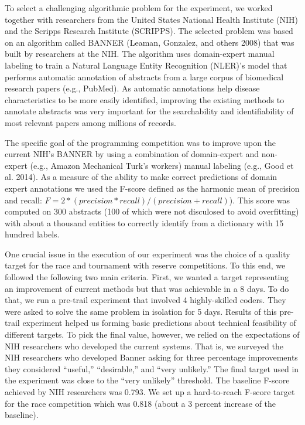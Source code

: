 \documentclass[10pt, titlepage]{article}
\begin{document}
To select a challenging algorithmic problem for the experiment, we
worked together with researchers from the United States National Health
Institute (NIH) and the Scripps Research Institute (SCRIPPS). The
selected problem was based on an algorithm called BANNER (Leaman,
Gonzalez, and others 2008) that was built by researchers at the NIH. The
algorithm uses domain-expert manual labeling to train a Natural Language
Entity Recognition (NLER)'s model that performs automatic annotation of
abstracts from a large corpus of biomedical research papers (e.g.,
PubMed). As automatic annotations help disease characteristics to be
more easily identified, improving the existing methods to annotate
abstracts was very important for the searchability and identifiability
of most relevant papers among millions of records.

The specific goal of the programming competition was to improve upon the
current NIH's BANNER by using a combination of domain-expert and
non-expert (e.g., Amazon Mechanical Turk's workers) manual labeling
(e.g., Good et al. 2014). As a measure of the ability to make correct
predictions of domain expert annotations we used the F-score defined as
the harmonic mean of precision and recall:
\(F = 2 * (precision * recall) / (precision + recall)\)). This score was
computed on 300 abstracts (100 of which were not disculosed to avoid
overfitting) with about a thousand entities to correctly identify from a
dictionary with 15 hundred labels.

One crucial issue in the execution of our experiment was the choice of a
quality target for the race and tournament with reserve competitions. To
this end, we followed the following two main criteria. First, we wanted
a target representing an improvement of current methods but that was
achievable in a 8 days. To do that, we run a pre-trail experiment that
involved 4 highly-skilled coders. They were asked to solve the same
problem in isolation for 5 days. Results of this pre-trail experiment
helped us forming basic predictions about technical feasibility of
different targets. To pick the final value, however, we relied on the
expectations of NIH researchers who developed the current systems. That
is, we surveyed the NIH researchers who developed Banner asking for
three percentage improvements they considered ``useful,'' ``desirable,''
and ``very unlikely.'' The final target used in the experiment was close
to the ``very unlikely'' threshold. The baseline F-score achieved by NIH
researchers was 0.793. We set up a hard-to-reach F-score target for the
race competition which was 0.818 (about a 3 percent increase of the
baseline).
\end{document}
